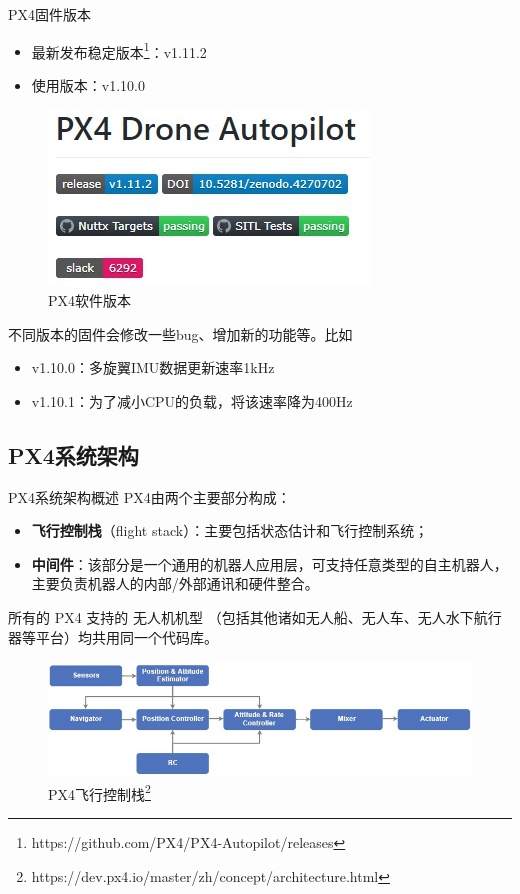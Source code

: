 \documentclass[10pt]{ctexbeamer}
\begin{document}
\begin{frame}[t]{PX4固件版本}
	\begin{itemize}
		\item 最新发布稳定版本\footnote{https://github.com/PX4/PX4-Autopilot/releases}：v1.11.2
		\item 使用版本：v1.10.0
	\end{itemize}
	\begin{figure}
		\includegraphics[scale=0.6]{image/release.jpg}
		\caption{PX4软件版本}
	\end{figure}
	不同版本的固件会修改一些bug、增加新的功能等。比如
	\begin{itemize}
		\item v1.10.0：多旋翼IMU数据更新速率1kHz
		\item v1.10.1：为了减小CPU的负载，将该速率降为400Hz
	\end{itemize}
\end{frame}


\subsection{PX4系统架构}

\begin{frame}[t]{PX4系统架构概述}
	PX4由两个主要部分构成：
	\begin{itemize}
		\item \textbf{飞行控制栈}（flight  stack）：主要包括状态估计和飞行控制系统；
		\item \textbf{中间件}：该部分是一个通用的机器人应用层，可支持任意类型的自主机器人，主要负责机器人的内部/外部通讯和硬件整合。
	\end{itemize}
	
	所有的 PX4 支持的 无人机机型 （包括其他诸如无人船、无人车、无人水下航行器等平台）均共用同一个代码库。
	\begin{figure}
		\includegraphics[scale=0.7]{image/stack.jpg}
		\caption{PX4飞行控制栈\footnote{https://dev.px4.io/master/zh/concept/architecture.html}}
	\end{figure}
\end{frame}
\end{document}
